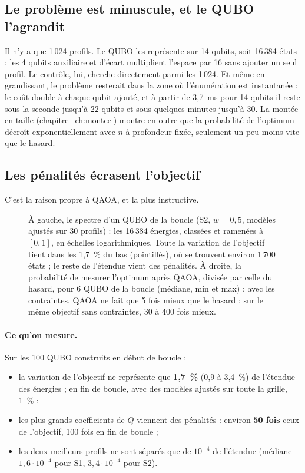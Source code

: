 \subsection{Le problème est minuscule, et le QUBO l'agrandit}
Il n'y a que 1\,024 profils. Le QUBO les représente sur 14 qubits, soit 16\,384 états : les 4 qubits auxiliaire et d'écart multiplient l'espace par 16 sans ajouter un seul profil. Le contrôle, lui, cherche directement parmi les 1\,024. Et même en grandissant, le problème resterait dans la zone où l'énumération est instantanée : le coût double à chaque qubit ajouté, et à partir de 3,7~ms pour 14 qubits il reste sous la seconde jusqu'à 22 qubits et sous quelques minutes jusqu'à 30. La montée en taille (chapitre~\ref{ch:montee}) montre en outre que la probabilité de l'optimum décroît exponentiellement avec $n$ à profondeur fixée, seulement un peu moins vite que le hasard.

\subsection{Les pénalités écrasent l'objectif}\label{sec:penalites-qaoa}
C'est la raison propre à QAOA, et la plus instructive.
\begin{figure}[htbp]
\centering

\caption{À gauche, le spectre d'un QUBO de la boucle (S2, $w=0{,}5$, modèles ajustés sur 30 profils) : les 16\,384 énergies, classées et ramenées à $[0,1]$, en échelles logarithmiques. Toute la variation de l'objectif tient dans les 1,7~\% du bas (pointillés), où se trouvent environ 1\,700 états ; le reste de l'étendue vient des pénalités. À droite, la probabilité de mesurer l'optimum après QAOA, divisée par celle du hasard, pour 6 QUBO de la boucle (médiane, min et max) : avec les contraintes, QAOA ne fait que 5 fois mieux que le hasard ; sur le même objectif sans contraintes, 30 à 400 fois mieux.}\label{fig:anatomie}
\end{figure}

\paragraph{Ce qu'on mesure.} Sur les 100 QUBO construits en début de boucle :
\begin{itemize}
\item la variation de l'objectif ne représente que \textbf{1,7~\%} (0,9 à 3,4~\%) de l'étendue des énergies ; en fin de boucle, avec des modèles ajustés sur toute la grille, 1~\% ;
\item les plus grands coefficients de $Q$ viennent des pénalités : environ \textbf{50 fois} ceux de l'objectif, 100 fois en fin de boucle ;
\item les deux meilleurs profils ne sont séparés que de $10^{-4}$ de l'étendue (médiane $1{,}6\cdot10^{-4}$ pour S1, $3{,}4\cdot10^{-4}$ pour S2).
\end{itemize}

